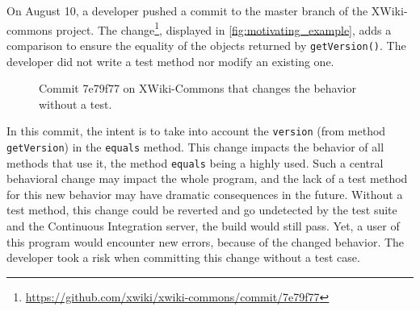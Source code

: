 On August 10, a developer pushed a commit to the master branch of the XWiki-commons project. 
The change\footnote{\url{https://github.com/xwiki/xwiki-commons/commit/7e79f77}}, displayed in \autoref{fig:motivating_example}, adds a comparison to ensure the equality of the objects returned by \texttt{getVersion()}.
The developer did not write a test method nor modify an existing one. 

\begin{figure}[h]
	\centering
	\caption{Commit 7e79f77 on XWiki-Commons that changes the behavior without a test.}
	\label{fig:motivating_example}
\end{figure}

In this commit, the intent is to take into account the \texttt{version} (from method \texttt{getVersion}) in the \texttt{equals} method.
This change impacts the behavior of all methods that use it, the method \texttt{equals} being a highly used.
Such a central behavioral change may impact the whole program, and the lack of a test method for this new behavior may have dramatic consequences in the future.
Without a test method, this change could be reverted and go undetected by the test suite and the Continuous Integration server, \ie the build would still pass.
Yet, a user of this program would encounter new errors, because of the changed behavior.
The developer took a risk when committing this change without a test case.

